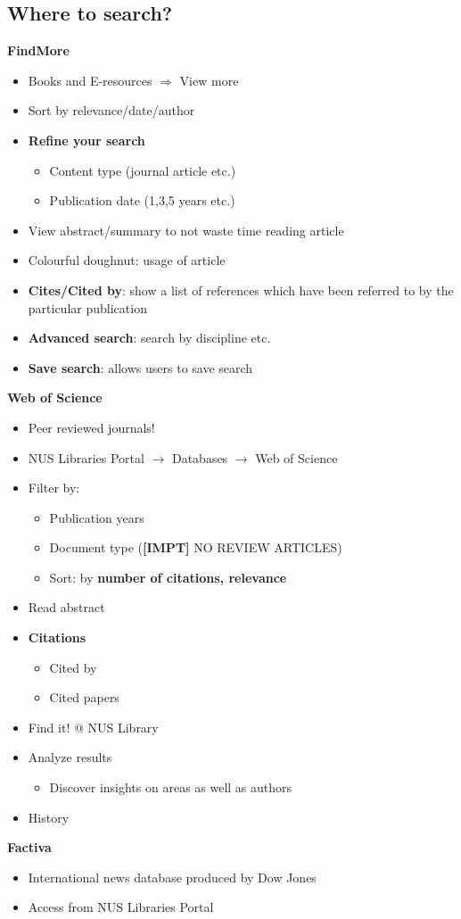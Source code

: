 \documentclass{article}
\begin{document}
\begin{multicols}{2}
\subsection{Where to search?}
\textbf{FindMore}
\begin{itemize}
	\item Books and E-resources $\Rightarrow$ View more
	\item Sort by relevance/date/author
	\item \textbf{Refine your search}
	\begin{itemize}
		\item Content type (journal article etc.)
		\item Publication date (1,3,5 years etc.)
	\end{itemize}
    \item View abstract/summary to not waste time reading article
    \item Colourful doughnut: usage of article
    \item \textbf{Cites/Cited by}: show a list of references which have been referred to by the particular publication
    \item \textbf{Advanced search}: search by discipline etc.
    \item \textbf{Save search}: allows users to save search
\end{itemize}
\textbf{Web of Science}
\begin{itemize}
	\item Peer reviewed journals!
	\item NUS Libraries Portal $\rightarrow$ Databases $\rightarrow$ Web of Science
	\item Filter by:
	\begin{itemize}
		\item Publication years
		\item Document type (\textbf{[IMPT]} NO REVIEW ARTICLES)
		\item Sort: by \textbf{number of citations, relevance}
	\end{itemize}
    \item Read abstract
    \item \textbf{Citations}
    \begin{itemize}
    	\item Cited by
    	\item Cited papers
    \end{itemize}
    \item Find it! @ NUS Library
    \item Analyze results
    \begin{itemize}
    	\item Discover insights on areas as well as authors
    \end{itemize}
    \item History
    \
\end{itemize}
\textbf{Factiva}
\begin{itemize}
	\item International news database produced by Dow Jones
	\item Access from NUS Libraries Portal
\end{itemize}

\end{multicols}
\end{document}

